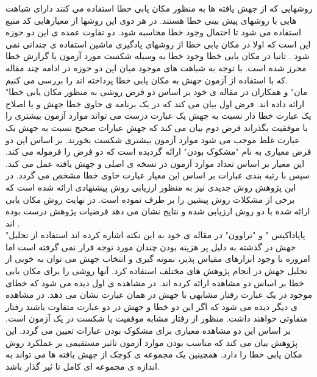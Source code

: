 روشهایی که از جهش یافته ها به منظور مکان یابی خطا استفاده می کنند دارای شباهت هایی با روشهای پیش بینی خطا هستند. در هر دوی این روشها از معیارهایی  کد منبع استفاده می شود تا احتمال وجود خطا محاسبه شود. دو تفاوت عمده ی این دو حوزه این است که اولا در مکان یابی خطا از روشهای یادگیری ماشین استفاده ی چندانی نمی شود . ثانیا در مکان یابی خطا وجود خطا به وسیله شکست مورد آزمون یا گزارش خطا محرز شده است. با توجه به شباهت های موجود میان این دو حوزه در ادامه چند مقاله که با استفاده از آزمون جهش به مکان یابی خطا پرداخته اند را بررسی می کنیم. \\

"مان" و همکاران در مقاله ی خود بر اساس دو فرض روشی به منظور مکان یابی خطا ارائه داده اند. فرض اول بیان می کند که  در یک برنامه ی حاوی خطا جهش و یا اصلاح یک عبارت خطا دار نسبت به جهش یک عبارت درست می تواند موارد آزمون بیشتری را  با موفقیت بگذراند فرض دوم  بیان می کند که جهش عبارات صحیح نسبت به جهش یک عبارت غلط موجب می شود موارد آزمون بیشتری شکست بخورند. بر اساس این دو فرض معیاری به نام "مشکوک بودن"  ارائه گردیده است که دو فرض را فرموله می کند. این معیار بر اساس تعداد موارد آزمون در نسخه ی اصلی و جهش یافته عمل می کند. سپس با رتبه بندی عبارات بر اساس این معیار عبارت حاوی خطا مشخص می گردد. در این پژوهش روش جدیدی نیز به منظور ارزیابی روش پیشنهادی ارائه شده است که برخی از مشکلات روش پیشین را بر طرف نموده است. در نهایت روش مکان یابی ارائه شده با دو روش ارزیابی شده و نتایج نشان می دهد فرضیات پژوهش درست بوده اند \cite{moon2014ask}. \\

"پاپاداکیس " و "تراوون" در مقاله ی خود به این نکته اشاره کرده اند استفاده از تحلیل جهش در گذشته به دلیل پر هزینه بودن چندان مورد توجه قرار نمی گرفته است اما امروزه با وجود ابزارهای مقیاس پذیر، نمونه گیری و انتخاب جهش می توان به خوبی از تحلیل جهش در انجام پژوهش های مختلف استفاده کرد\cite{papadakis2015metallaxis}. آنها روشی را برای مکان یابی خطا بر اساس دو مشاهده ارائه کرده اند. در مشاهده ی اول دیده می شود که خطای موجود در یک عبارت رفتار مشابهی با جهش در همان عبارت نشان می دهد. در مشاهده ی دیگر دیده می شود که اگر این دو خطا و جهش در دو عبارت متفاوت باشند رفتار متفاوتی خواهند داشت. منظور از رفتار مشابه موفقیت یا شکست در یک آزمون است. بر اساس این دو مشاهده معیاری برای مشکوک بودن عبارات تعیین می گردد. این پژوهش بیان می کند که مناسب بودن موارد آزمون تاثیر مستقیمی بر عملکرد روش مکان یابی خطا را دارد. همچینین یک مجموعه ی کوچک از جهش یافته ها می تواند به اندازه ی مجموعه ای کامل تا ثیر گذار باشد. \\

